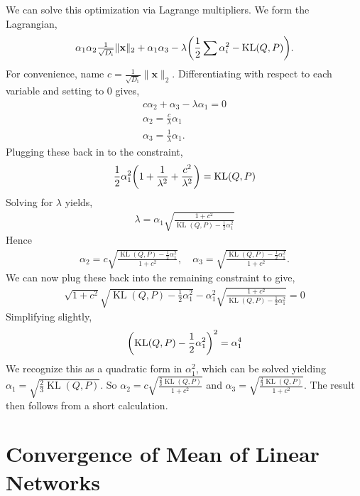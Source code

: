 \documentclass[twoside]{article}
\renewcommand{\ss}[1]{_{\text{#1}}}
\newcommand{\vx}{\mathbf{x}}
\renewcommand{\P}{\mathbb{P}}
\newcommand{\Q}{\mathbb{Q}}
\renewcommand{\Q}{\ensuremath{Q}}
\renewcommand{\P}{\ensuremath{P}}
\newcommand{\KL}{\operatorname{KL}}
\renewcommand{\ss}[1]{_{\text{#1}}}        %
\DeclarePairedDelimiter\parens{(}{)}             %
\theoremstyle{theoremstyle}
\begin{document}
We can solve this optimization via Lagrange multipliers. We form the Lagrangian,
\begin{align}
    \alpha_1\alpha_2 \tfrac{1}{\sqrt{D\ss{i}}}\|\vx\|_2 + \alpha_1\alpha_3 - \lambda \parens*{\frac{1}{2}\sum \alpha_i^2 - \KL(\Q,\P)}.
\end{align}
For convenience, name $c = \tfrac{1}{\sqrt{D\ss{i}}}\|\vx\|_2$. Differentiating with respect to each variable and setting to $0$ gives,
\begin{align}
    c\alpha_2 + \alpha_3 - \lambda \alpha_1 = 0 \\
   \alpha_2  =\frac{c}{\lambda}\alpha_1  \\
    \alpha_3 = \frac{1}{\lambda}\alpha_1.
\end{align}
Plugging these back in to the constraint,
\begin{align}
    \frac{1}{2}\alpha_1^2\parens*{1+\frac{1}{\lambda^2} + \frac{c^2}{\lambda^2}} = \KL(\Q,\P)
\end{align}
Solving for $\lambda$ yields,
\begin{align}
    \lambda = \alpha_1 \sqrt{\frac{1+c^2}{\KL(\Q,\P)-\frac{1}{2}\alpha_1^2}} 
\end{align}
Hence
\begin{align}
    \alpha_2  =c\sqrt{\frac{\KL(\Q,\P)-\frac{1}{2}\alpha_1^2}{1+c^2}}, \quad 
    \alpha_3 = \sqrt{\frac{\KL(\Q,\P)-\frac{1}{2}\alpha_1^2}{1+c^2}}.
\end{align}
We can now plug these back into the remaining constraint to give,
\begin{align}
\sqrt{1+c^2}\sqrt{\KL(\Q,\P)-\frac{1}{2}\alpha_1^2} - \alpha_1^2\sqrt{\frac{1+c^2}{\KL(\Q,\P)-\frac{1}{2}\alpha_1^2}} = 0
\end{align}
Simplifying slightly,
\begin{align}
\parens*{\KL(\Q,\P)-\frac{1}{2}\alpha_1^2}^2 = \alpha_1^4
\end{align}
We recognize this as a quadratic form in $\alpha_1^2$, which can be solved yielding $\alpha_1 = \sqrt{\frac{2}{3}\KL(\Q,\P)}$. So $\alpha_2 = c \sqrt{\frac{\frac{2}{3}\KL(\Q,\P)}{1+c^2}}$ and $\alpha_3 = \sqrt{\frac{\frac{2}{3}\KL(\Q,\P)}{1+c^2}}.$ The result then follows from a short calculation.


\section{Convergence of Mean of Linear Networks}\label{app:convergence-linear-nets}
\end{document}
